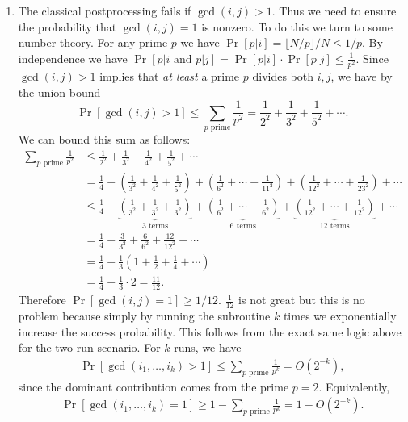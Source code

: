 \begin{enumerate}
    \item The classical postprocessing fails if $\gcd(i,j) > 1$. Thus we need to ensure the probability that $\gcd(i,j)=1$ is nonzero. To do this we turn to some number theory. For any prime $p$ we have $\Pr[p|i] = \lfloor N/p \rfloor/N \leq 1/p$. By independence we have $\Pr[p|i \text{ and } p|j] = \Pr[p|i] \cdot \Pr[p|j] \leq \frac{1}{p^2}$. Since $\gcd(i,j) > 1$ implies that \textit{at least} a prime $p$ divides both $i,j$, we have by the union bound
    $$\Pr[\gcd(i,j) > 1] \leq \sum_{p \text{ prime}} \frac{1}{p^2} = \frac{1}{2^2} + \frac{1}{3^2} + \frac{1}{5^2} + \cdots.$$
    We can bound this sum as follows:
    \begin{align*}
    \sum_{p \text{ prime}} \frac{1}{p^2}
    &\leq \frac{1}{2^2} + \frac{1}{3^2} + \frac{1}{4^2} + \frac{1}{5^2} + \cdots\\
    &= \frac{1}{4} + \left(\frac{1}{3^2} + \frac{1}{4^2} + \frac{1}{5^2}\right) + \left(\frac{1}{6^2} + \cdots + \frac{1}{11^2}\right) + \left(\frac{1}{12^2} + \cdots + \frac{1}{23^2}\right) + \cdots\\
    &\leq \frac{1}{4} + \underbrace{\left(\frac{1}{3^2} + \frac{1}{3^2} + \frac{1}{3^2}\right)}_{3\text{ terms}} + \underbrace{\left(\frac{1}{6^2} + \cdots + \frac{1}{6^2}\right)}_{6\text{ terms}} + \underbrace{\left(\frac{1}{12^2} + \cdots + \frac{1}{12^2}\right)}_{12\text{ terms}} + \cdots\\
    &= \frac{1}{4} + \frac{3}{3^2} + \frac{6}{6^2} + \frac{12}{12^2} + \cdots\\
    &= \frac{1}{4} + \frac{1}{3}\left(1 + \frac{1}{2} + \frac{1}{4} + \cdots\right)\\
    &= \frac{1}{4} + \frac{1}{3}\cdot 2 = \frac{11}{12}.
    \end{align*}
    Therefore $\Pr[\gcd(i,j)=1] \geq 1/12$. $\frac{1}{12}$ is not great but this is no problem because simply by running the subroutine $k$ times we exponentially increase the success probability. This follows from the exact same logic above for the two-run-scenario. For $k$ runs, we have
    \begin{align*}
        \Pr \left[\gcd\left(i_1,\dots,i_k \right) >1 \right] \leq \sum_{p \text{ prime}} \frac{1}{p^k} = O(2^{-k}),
    \end{align*}
    since the dominant contribution comes from the prime $p=2$. Equivalently,
    \begin{align*}
        \Pr \left[\gcd\left(i_1,\dots,i_k \right) = 1 \right] \geq 1- \sum_{p \text{ prime}} \frac{1}{p^k} = 1- O(2^{-k}).
    \end{align*}

\end{enumerate}

